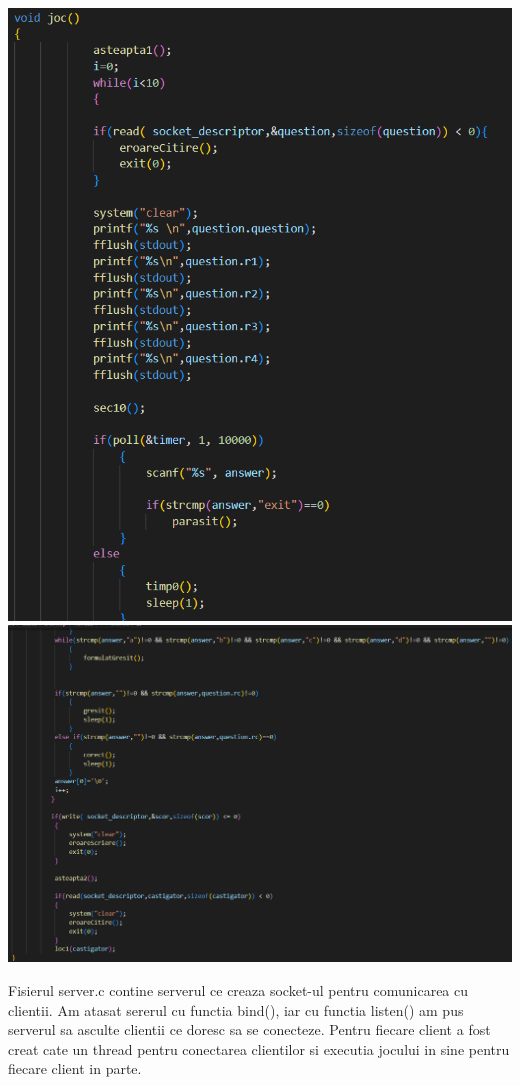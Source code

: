 \documentclass{article}
\begin{document}
\includegraphics[scale=0.35]{client1}
\includegraphics[scale=0.35]{client2}

\vspace{0.3cm}

Fisierul server.c contine serverul ce creaza socket-ul pentru comunicarea cu clientii. Am atasat sererul cu functia bind(), iar cu functia listen() am pus serverul sa asculte clientii ce doresc sa se conecteze. Pentru fiecare client a fost creat cate un thread pentru conectarea clientilor si executia jocului in sine pentru fiecare client in parte.
\end{document}
